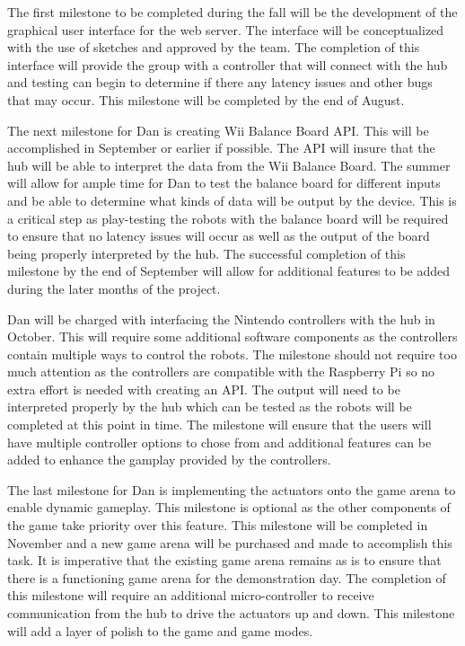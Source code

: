 \documentclass[11pt]{ieeeconf}
\begin{document}
The first milestone to be completed during the fall will be the development of the graphical user interface for the web server. The interface will be conceptualized with the use of sketches and approved by the team. The completion of this interface will provide the group with a controller that will connect with the hub and testing can begin to determine if there any latency issues and other bugs that may occur. This milestone will be completed by the end of August.  

The next milestone for Dan is creating Wii Balance Board API. This will be accomplished in September or earlier if possible. The API will insure that the hub will be able to interpret the data from the Wii Balance Board. The summer will allow for ample time for Dan to test the balance board for different inputs and be able to determine what kinds of data will be output by the device. This is a critical step as play-testing the robots with the balance board will be required to ensure that no latency issues will occur as well as the output of the board being properly interpreted by the hub. The successful completion of this milestone by the end of September will allow for additional features to be added during the later months of the project.  

Dan will be charged with interfacing the Nintendo controllers with the hub in October. This will require some additional software components as the controllers contain multiple ways to control the robots. The milestone should not require too much attention as the controllers are compatible with the Raspberry Pi so no extra effort is needed with creating an API. The output will need to be interpreted properly by the hub which can be tested as the robots will be completed at this point in time. The milestone will ensure that the users will have multiple controller options to chose from and additional features can be added to enhance the gamplay provided by the controllers.

The last milestone for Dan is implementing the actuators onto the game arena to enable dynamic gameplay. This milestone is optional as the other components of the game take priority over this feature. This milestone will be completed in November and a new game arena will be purchased and made to accomplish this task. It is imperative that the existing game arena remains as is to ensure that there is a functioning game arena for the demonstration day. The completion of this milestone will require an additional micro-controller to receive communication from the hub to drive the actuators up and down. This milestone will add a layer of polish to the game and game modes.
\end{document}
